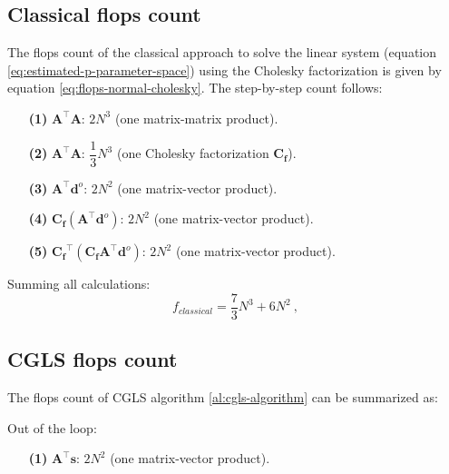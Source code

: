 
\subsection{Classical flops count}

The flops count of the classical approach to solve the linear system (equation \ref{eq:estimated-p-parameter-space}) using the Cholesky factorization is given by equation \ref{eq:flops-normal-cholesky}. The step-by-step count follows:
\begin{itemize}
\item[\textbf{(1)}] $\mathbf{A}^{\top}\mathbf{A}$: $2 N^3$ (one matrix-matrix product).

\item[\textbf{(2)}] $\mathbf{A}^{\top} \mathbf{A}$: $\dfrac{1}{3} N^3$ (one Cholesky factorization $\mathbf{C_f}$).

\item[\textbf{(3)}] $\mathbf{A}^{\top} \mathbf{d}^{o}$: $2 N^2$ (one matrix-vector product).

\item[\textbf{(4)}] $\mathbf{C_f} (\mathbf{A}^{\top} \mathbf{d}^{o})$: $2 N^2$ (one matrix-vector product).

\item[\textbf{(5)}] $\mathbf{C_f}^{\top} (\mathbf{C_f} \mathbf{A}^{\top} \mathbf{d}^{o})$: $2 N^2$ (one matrix-vector product).
\end{itemize}
Summing all calculations: 
\begin{equation}
f_{classical} =  \dfrac{7}{3} N^{3} + 6 N^{2}\: ,
\label{eq:flops-normal-cholesky-append}
\end{equation}

\subsection{CGLS flops count}

The flops count of CGLS algorithm \ref{al:cgls-algorithm} can be summarized as:

Out of the loop:

\begin{itemize}

\item[\textbf{(1)}] $\mathbf{A}^{\top} \mathbf{s}$: $2 N^2$ (one matrix-vector product).
\end{itemize}

